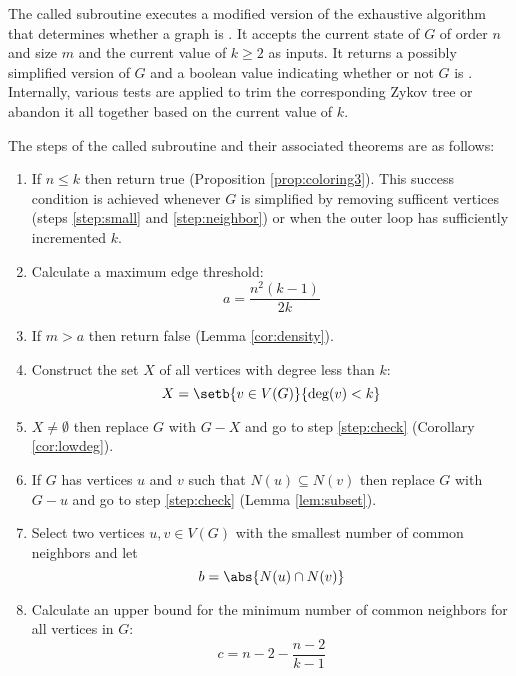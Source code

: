 The called subroutine executes a modified version of the exhaustive algorithm that determines whether a graph is
.  It accepts the current state of \(G\) of order \(n\) and size \(m\) and the current value of
\(k\ge2\) as inputs.  It returns a possibly simplified version of \(G\) and a boolean value indicating whether or
not \(G\) is .  Internally, various tests are applied to trim the corresponding Zykov tree or abandon
it all together based on the current value of \(k\).

The steps of the called subroutine and their associated theorems are as follows:

\begin{enumerate}
\item \label{step:check} If \(n\le k\) then return true (Proposition \ref{prop:coloring3}).  This success condition
  is achieved whenever \(G\) is simplified by removing sufficent vertices (steps \ref{step:small} and
  \ref{step:neighbor}) or when the outer loop has sufficiently incremented \(k\).

\item \label{step:dencalc} Calculate a maximum edge threshold:
  \[a=\frac{n^2(k-1)}{2k}\]

\item \label{step:density} If \(m>a\) then return false (Lemma \ref{cor:density}).

\item \label{step:smallcalc} Construct the set \(X\) of all vertices with degree less than \(k\):
  \[X=\setb{v\in V(G)}{\deg(v)<k}\]

\item \label{step:small} \(X\ne\emptyset\) then replace \(G\) with \(G-X\) and go to step \ref{step:check} (Corollary
  \ref{cor:lowdeg}).

\item \label{step:neighbor} If \(G\) has vertices \(u\) and \(v\) such that \(N(u)\subseteq N(v)\) then replace
  \(G\) with \(G-u\) and go to step \ref{step:check} (Lemma \ref{lem:subset}).

\item \label{step:select} Select two vertices \(u,v\in V(G)\) with the smallest number of common neighbors and let
  \[b=\abs{N(u)\cap N(v)}\]

\item \label{step:neighcalc} Calculate an upper bound for the minimum number of common neighbors for all vertices
  in \(G\):
  \[c=n-2-\frac{n-2}{k-1}\]


\end{enumerate}
